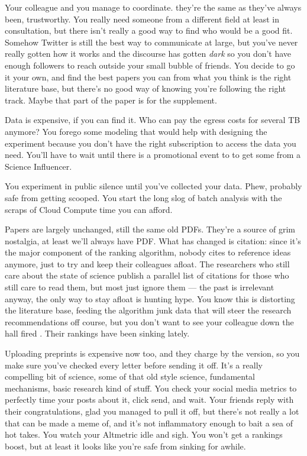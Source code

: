 \documentclass[10pt]{article}
\begin{document}
\begin{multicols}{2}
Your colleague and you manage to coordinate. they're the same as they've
always been, trustworthy. You really need someone from a different field
at least in consultation, but there isn't really a good way to find who
would be a good fit. Somehow Twitter is still the best way to
communicate at large, but you've never really gotten how it works and
the discourse has gotten \emph{dark} so you don't have enough followers
to reach outside your small bubble of friends. You decide to go it your
own, and find the best papers you can from what you think is the right
literature base, but there's no good way of knowing you're following the
right track. Maybe that part of the paper is for the supplement.

Data is expensive, if you can find it. Who can pay the egress costs for
several TB anymore? You forego some modeling that would help with
designing the experiment because you don't have the right subscription
to access the data you need. You'll have to wait until there is a
promotional event to to get some from a Science Influencer.

You experiment in public silence until you've collected your data. Phew,
probably safe from getting scooped. You start the long slog of batch
analysis with the scraps of Cloud Compute time you can afford.

Papers are largely unchanged, still the same old PDFs. They're a source
of grim nostalgia, at least we'll always have PDF. What has changed is
citation: since it's the major component of the ranking algorithm,
nobody cites to reference ideas anymore, just to try and keep their
colleagues afloat. The researchers who still care about the state of
science publish a parallel list of citations for those who still care to
read them, but most just ignore them --- the past is irrelevant anyway,
the only way to stay afloat is hunting hype. You know this is distorting
the literature base, feeding the algorithm junk data that will steer the
research recommendations off course, but you don't want to see your
colleague down the hall fired \cite{brembsAlgorithmicEmploymentDecisions2021} . Their rankings have been
sinking lately.

Uploading preprints is expensive now too, and they charge by the
version, so you make sure you've checked every letter before sending it
off. It's a really compelling bit of science, some of that old style
science, fundamental mechanisms, basic research kind of stuff. You check
your social media metrics to perfectly time your posts about it, click
send, and wait. Your friends reply with their congratulations, glad you
managed to pull it off, but there's not really a lot that can be made a
meme of, and it's not inflammatory enough to bait a sea of hot takes.
You watch your Altmetric idle and sigh. You won't get a rankings boost,
but at least it looks like you're safe from sinking for awhile.


\end{multicols}
\end{document}
